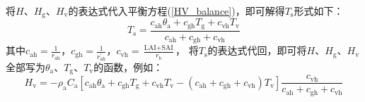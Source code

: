 将$H$、$H_{\mathrm{g}}$、$H_{\mathrm{v}}$的表达式代入平衡方程(\ref{HV_balance})，即可解得$T_{\mathrm {s}}$形式如下：
\begin{equation}
  T_{\mathrm{s}}=\frac{c_{\mathrm{ah}} \theta_{\mathrm{a}}+c_{\mathrm{gh}} T_{\mathrm{g}}+c_{\mathrm{vh}} T_{\mathrm{v}}}{c_{\mathrm{ah}}+c_{\mathrm{gh}}+c_{\mathrm{vh}}}
\end{equation}
其中$c_{\mathrm{ah}}=\frac{1}{r_{\mathrm{ah}}}$，$c_{\mathrm{gh}}=\frac{1}{r_{\mathrm{ah}}^\prime}$，$c_{\mathrm{vh}}=\frac{\text {LAI}+\text {SAI}}{r_{\mathrm {b}}}$，
将$T_{\mathrm {s}}$的表达式代回，即可将$H$、$H_{\mathrm{g}}$、$H_{\mathrm{v}}$全部写为$\theta_{\mathrm{a}}$、$T_{\mathrm {g}}$、$T_{\mathrm v}$的函数，例如：
\begin{equation}
  H_{\mathrm{v}}=-\rho_{\mathrm{a}} C_{\mathrm{a}}\left[c_{\mathrm{ah}} \theta_{\mathrm{a}}+c_{\mathrm{gh}}
    T_{\mathrm{g}}+c_{\mathrm{vh}} T_{\mathrm{v}}-\left(c_{\mathrm{ah}}+c_{\mathrm{gh}}+c_{\mathrm{vh}}\right)
  T_{\mathrm{v}}\right] \frac{c_{\mathrm{vh}}}{c_{\mathrm{ah}}+c_{\mathrm{gh}}+c_{\mathrm{vh}}}
\end{equation}


